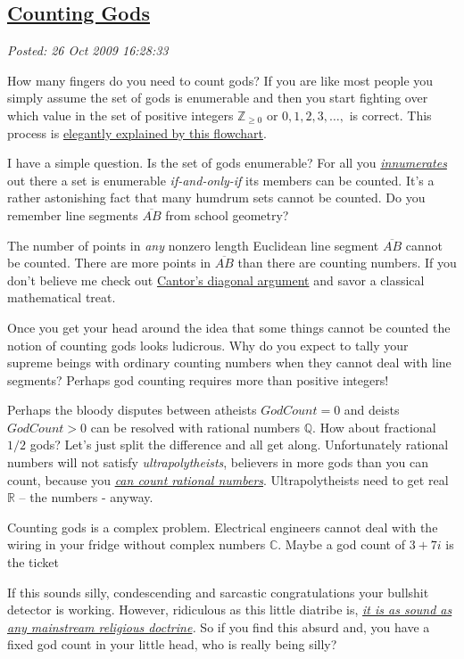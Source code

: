 %

\subsection*{\href{http://bakerjd99.wordpress.com/2009/10/26/counting-gods/}{Counting Gods}}


\noindent\emph{Posted: 26 Oct 2009 16:28:33}
\vspace{6pt}

How many fingers do you need to count gods? If you are like most people
you simply assume the set of gods is enumerable and then you start
fighting over which value in the set of positive integers $\mathbb{Z}_{\geq0}$
or ${0, 1, 2, 3, \ldots, }$ is correct. This process is
\href{http://conceptcontrol.smugmug.com/photos/1123810114\_ARzWN-L.jpg}{elegantly
explained by this flowchart}.

I have a simple question. Is the set of gods enumerable? For all you
\href{http://www.aolsvc.merriam-webster.aol.com/dictionary/innumerate}{\emph{innumerates}} out
there a set is enumerable \emph{if-and-only-if} its members can be
counted. It's a rather astonishing fact that many humdrum sets cannot be
counted. Do you remember line segments $\overline{AB}$ from school
geometry?

The number of points in \emph{any} nonzero length Euclidean line segment
$\overline{AB}$ cannot be counted. There are more points in $\overline{AB}$
than there are counting numbers. If you don't believe me check out
\href{http://en.wikipedia.org/wiki/Cantor's\_diagonal\_argument}{Cantor's
diagonal argument} and savor a classical mathematical treat.

Once you get your head around the idea that some things cannot be
counted the notion of counting gods looks ludicrous. Why do you expect
to tally your supreme beings with ordinary counting numbers when they
cannot deal with line segments? Perhaps god counting requires more than
positive integers!

Perhaps the bloody disputes between atheists $GodCount=0$ and deists
$GodCount > 0$ can be resolved with rational numbers $\mathbb{Q}$. How
about fractional $1/2$ gods? Let's just split the difference and
all get along. Unfortunately rational numbers will not satisfy
\emph{ultrapolytheists}, believers in more gods than you can count,
because you
\emph{\href{http://www.homeschoolmath.net/teaching/rational-numbers-countable.php}{can
count rational numbers}}. Ultrapolytheists need to get real
$\mathbb{R}$ -- the numbers - anyway.

Counting gods is a complex problem. Electrical engineers cannot deal
with the wiring in your fridge without complex numbers $\mathbb{C}$.
Maybe a god count of $3 + 7i$ is the ticket

If this sounds silly, condescending and sarcastic congratulations your
bullshit detector is working. However, ridiculous as this little
diatribe is, \emph{\href{http://www.ffrf.org/}{it is as sound as any
mainstream religious doctrine}.} So if you find this absurd and, you
have a fixed god count in your little head, who is really being silly?


%